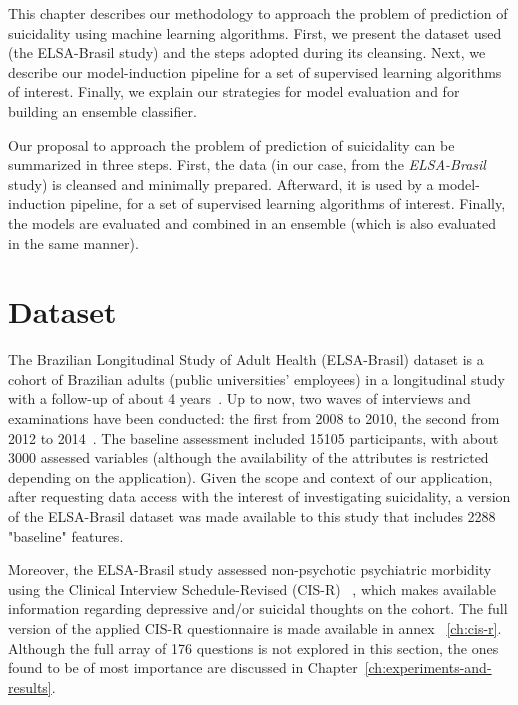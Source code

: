 This chapter describes our methodology to approach the problem of prediction of suicidality using machine learning algorithms.
First, we present the dataset used (the ELSA-Brasil study) and the steps adopted during its cleansing.
Next, we describe our model-induction pipeline for a set of supervised learning algorithms of interest.
Finally, we explain our strategies for model evaluation and for building an ensemble classifier.

Our proposal to approach the problem of prediction of suicidality can be summarized in three steps.
First, the data (in our case, from the \textit{ELSA-Brasil} study) is cleansed and minimally prepared.
Afterward, it is used by a model-induction pipeline, for a set of supervised learning algorithms of interest.
Finally, the models are evaluated and combined in an ensemble (which is also evaluated in the same manner).


\section{Dataset}\label{sec:dataset}

The Brazilian Longitudinal Study of Adult Health (ELSA-Brasil) dataset is a cohort of Brazilian adults (public universities' employees) in a longitudinal study with a follow-up of about 4 years~\cite{Schmidt2015, Aquino2012}.
Up to now, two waves of interviews and examinations have been conducted: the first from 2008 to 2010, the second from 2012 to 2014~\cite{Olivera2017}.
The baseline assessment included 15105 participants, with about 3000 assessed variables (although the availability of the attributes is restricted depending on the application).
Given the scope and context of our application, after requesting data access with the interest of investigating suicidality, a version of the ELSA-Brasil dataset was made available to this study that includes 2288 "baseline" features.

Moreover, the ELSA-Brasil study assessed non-psychotic psychiatric morbidity using the Clinical Interview Schedule-Revised (CIS-R) ~\cite{Nunes2016, Lewis1992}, which makes available information regarding depressive and/or suicidal thoughts on the cohort.
The full version of the applied CIS-R questionnaire is made available in annex ~\ref{ch:cis-r}.
Although the full array of 176 questions is not explored in this section, the ones found to be of most importance are discussed in Chapter~\ref{ch:experiments-and-results}.

